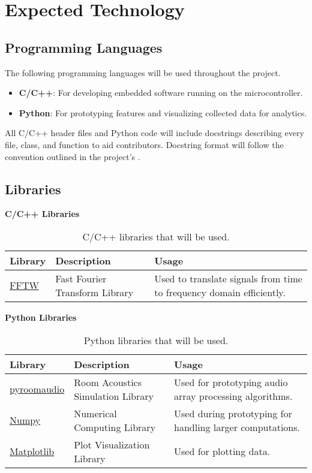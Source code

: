 \documentclass{article}
\begin{document}
\section{Expected Technology}

\subsection{Programming Languages}
The following programming languages will be used throughout the project.
\begin{itemize}
  \item \textbf{C/C++}: For developing embedded software running on the
  microcontroller.
  \item \textbf{Python}: For prototyping features and visualizing collected data
  for analytics.
\end{itemize}

All C/C++ header files and Python code will include docstrings describing every
file, class, and function to aid contributors. Docstring format will follow the
convention outlined in the project's .

\subsection{Libraries}

\textbf{C/C++ Libraries}
\begin{table}[h!]
\centering
\begin{tabularx}{\textwidth}{|l|X|X|}
\hline
\textbf{Library} & \textbf{Description} & \textbf{Usage} \\ \hline
\href{https://www.fftw.org/}{FFTW} & Fast Fourier Transform Library & Used to
translate signals from time to frequency domain efficiently. \\ \hline
\end{tabularx}
\caption{C/C++ libraries that will be used.}
\end{table}

\textbf{Python Libraries}
\begin{table}[h!]
\centering
\begin{tabularx}{\textwidth}{|l|X|X|}
\hline
\textbf{Library} & \textbf{Description} & \textbf{Usage} \\ \hline
\href{https://pypi.org/project/pyroomacoustics/}{pyroomaudio} & Room Acoustics
Simulation Library  & Used for prototyping audio array processing algorithms. \\
\hline
\href{https://numpy.org/}{Numpy} & Numerical Computing Library  & Used during
prototyping for handling larger computations. \\ \hline
\href{https://matplotlib.org/}{Matplotlib} & Plot Visualization Library  & Used
for plotting data. \\ \hline
\end{tabularx}
\caption{Python libraries that will be used.}
\end{table}
\end{document}
